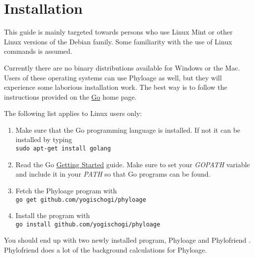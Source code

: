 \section{Installation}

This guide is mainly targeted towards persons who use Linux Mint
or other Linux versions of the Debian family. Some familiarity
with the use of Linux commands is assumed.

Currently there are no binary distributions available for
Windows or the Mac. Users of these operating systems can
use Phyloage as well, but they will experience some
laborious installation work. The best way is to follow the
instructions provided on the
\href{http://golang.org/}{Go} home page.

The following list applies to Linux users only:

\begin{enumerate}
\item Make sure that the Go programming language is installed.
	If not it can be installed by typing\\
	\texttt{sudo apt-get install golang}
\item Read the Go
	\href{http://golang.org/doc/install}{Getting Started}
	guide. Make sure to set your \emph{GOPATH} variable and
	include it in your \emph{PATH} so that Go programs can be
	found.
\item Fetch the Phyloage program with\\
	\texttt{go get github.com/yogischogi/phyloage}
\item Install the program with\\
	 \texttt{go install github.com/yogischogi/phyloage}
\end{enumerate}

You should end up with two newly installed program, Phyloage
and Phylofriend \cite{Phylofriend}. Phylofriend does a lot
of the background calculations for Phyloage.

